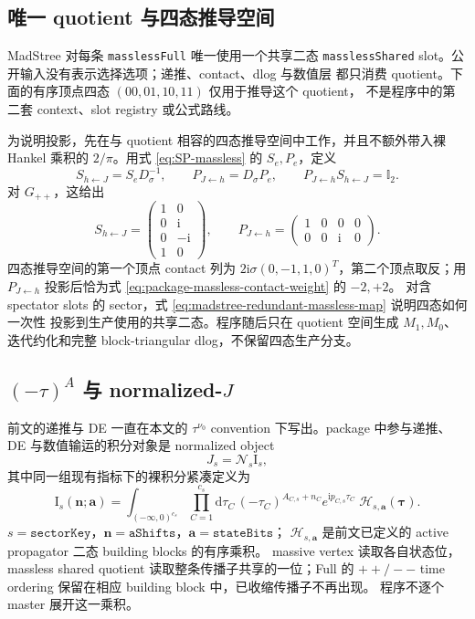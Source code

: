 \documentclass[11pt,a4paper]{ctexart}
\newcommand{\dd}{\mathrm d}
\newcommand{\ii}{\mathrm i}
\newcommand{\Id}{\mathbb I}
\newcommand{\cN}{\mathcal N}
\begin{document}
\subsection{唯一 quotient 与四态推导空间}

MadStree 对每条 \texttt{masslessFull} 唯一使用一个共享二态
\texttt{masslessShared} slot。公开输入没有表示选择选项；递推、contact、dlog 与数值层
都只消费 quotient。下面的有序顶点四态 $(00,01,10,11)$ 仅用于推导这个 quotient，
不是程序中的第二套 context、slot registry 或公式路线。

为说明投影，先在与 quotient 相容的四态推导空间中工作，并且不额外带入裸 Hankel 乘积的
$2/\pi$。用式 \eqref{eq:SP-massless} 的 $S_e,P_e$，定义
\begin{equation}
 S_{h\leftarrow J}=S_eD_{\sigma}^{-1},\qquad
 P_{J\leftarrow h}=D_{\sigma}P_e,\qquad
 P_{J\leftarrow h}S_{h\leftarrow J}=\Id_2.
 \label{eq:madstree-redundant-massless-map}
\end{equation}
对 $G_{++}$，这给出
\begin{equation}
 S_{h\leftarrow J}=\begin{pmatrix}1&0\\0&\ii\\0&-\ii\\1&0\end{pmatrix},
 \qquad
 P_{J\leftarrow h}=\begin{pmatrix}1&0&0&0\\0&0&\ii&0\end{pmatrix}.
\end{equation}
四态推导空间的第一个顶点 contact 列为
$2\ii\sigma(0,-1,1,0)^T$，第二个顶点取反；用
$P_{J\leftarrow h}$ 投影后恰为式 \eqref{eq:package-massless-contact-weight} 的 $-2,+2$。
对含 spectator slots 的 sector，式 \eqref{eq:madstree-redundant-massless-map} 说明四态如何一次性
投影到生产使用的共享二态。程序随后只在 quotient 空间生成 $M_1,M_0$、迭代约化和完整
block-triangular dlog，不保留四态生产分支。

\subsection{\texorpdfstring{$(-\tau)^A$ 与 normalized-$J$}{(-tau)A 与 normalized-J}}
\label{sec:normalized-J}

前文的递推与 DE 一直在本文的 $\tau^{\nu_0}$ convention 下写出。package 中参与递推、DE 与数值输运的积分对象是 normalized object
\begin{equation}
 J_s=\cN_s\text{I}_s,
\end{equation}
其中同一组现有指标下的裸积分紧凑定义为
\begin{equation}
 \text{I}_s(\bm n;\bm a)=
 \int_{(-\infty,0)^{c_s}}
 \prod_{C=1}^{c_s}\!\dd\tau_C\,
 (-\tau_C)^{A_{C,s}+n_C}e^{\ii p_{C,s}\tau_C}
 \;\mathcal H_{s,\bm a}(\bm\tau).
 \label{eq:package-bare-integral}
\end{equation}
$s=\texttt{sectorKey}$，$\bm n=\texttt{aShifts}$，$\bm a=\texttt{stateBits}$；
$\mathcal H_{s,\bm a}$ 是前文已定义的 active propagator 二态 building blocks 的有序乘积。
massive vertex 读取各自状态位，massless shared quotient 读取整条传播子共享的一位；Full 的
$++/--$ time ordering 保留在相应 building block 中，已收缩传播子不再出现。
程序不逐个 master 展开这一乘积。
\end{document}
